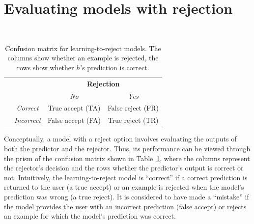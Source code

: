 \newpage
\section{Evaluating models with rejection}~\label{sec:metrics}

\begin{table}[htbp]
\centering
\normalsize{
\begin{tabular}{cc|c|c}
\multicolumn{2}{c}{}  & \multicolumn{2}{c}{\textbf{Rejection}} \\
\parbox[t]{1mm}{}                            &           & \emph{No}                & \emph{Yes}               \\
                            \cmidrule(lr){3-4}
                  & \emph{Correct}   & True accept (TA)  & False reject (FR) \\
                            & \emph{Incorrect} & False accept (FA) & True reject (TR) 
\end{tabular}
}
\vspace{0.3cm}
\caption{Confusion matrix for learning-to-reject models. The columns show whether an example is rejected, the rows show whether $h$'s prediction is correct.}\label{tab:confusion_matrix_for_rejection}
\end{table}

\noindent Conceptually, a model with a reject option involves evaluating the outputs of both the predictor and the rejector. Thus, its performance can be viewed through the prism of the confusion matrix shown in Table~\ref{tab:confusion_matrix_for_rejection}, where the columns represent the rejector's decision and the rows whether the predictor's output is correct or not.
Intuitively, the learning-to-reject model is ``correct'' if a correct prediction is returned to the user (a true accept) or an example is rejected when the model's prediction was wrong (a true reject). It is considered to have made a ``mistake'' if the model provides the user with an incorrect prediction (false accept) or rejects an example for which the model's prediction was correct.

